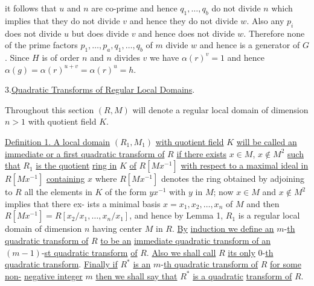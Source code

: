 it follows that $u$ and $n$ are co-prime and hence $q_1,\ldots,q_b$
do not divide $n$ which implies that they do not divide $v$ and
hence they do not divide $w$. Also any $p_i$ does not divide $u$
but does divide $v$ and hence does not divide $w$. Therefore none
of the prime factors $p_1,\ldots,p_a,q_1,\ldots,q_b$ of $m$ divide $w$
and hence  is a generator of $G$. Since $H$ is
of order $n$ and $n$ divides $v$ we have $\alpha(r)^v=1$ and hence
$\alpha(g)=\alpha(r)^{u+v}=\alpha(r)^u=h$.

3.\quad\uline{Quadratic Transforms of Regular Local Domains}.

Throughout this section $(R,M)$ will denote a regular local
domain of dimension $n>1$ with quotient field $K$.

\uline{Definition 1. A local domain} $(R_1,M_1)$ \uline{with quotient field}
$K$ \uline{will be called an immediate or a first quadratic transform of}
$R$ \uline{if there exists} $x\in M$, $x\notin M^2$ \uline{such that} $R_1$ \uline{is the quotient}
\uline{ring in} $K$ \uline{of} $R[Mx^{-1}]$ \uline{with respect to a maximal ideal in}
$R[Mx^{-1}]$ \uline{containing} $x$ where $R[Mx^{-1}]$ denotes the ring obtained
by adjoining to $R$ all the elements in $K$ of the form $yx^{-1}$
with $y$ in $M$; now $x\in M$ and $x\notin M^2$ implies that there ex-
ists a minimal basis $x=x_1,x_2,\ldots,x_n$ of $M$ and then
$R[Mx^{-1}]=R[x_2/x_1,\ldots,x_n/x_1]$, and hence by Lemma 1, $R_1$ is a
regular local domain of dimension $n$ having center $M$ in $R$. \uline{By}
\uline{induction we define an} $m$-\uline{th quadratic transform of} $R$ \uline{to be an}
\uline{immediate quadratic transform of an} $(m-1)$-\uline{st quadratic transform}
\uline{of} $R$. \uline{Also we shall call} $R$ \uline{its only} $0$-\uline{th quadratic transform}.
\uline{Finally if} $R^*$ \uline{is an} $m$-\uline{th quadratic transform of} $R$ \uline{for some non-}
\uline{negative integer} $m$ \uline{then we shall say that} $R^*$ \uline{is a quadratic}
\uline{transform of} $R$.
